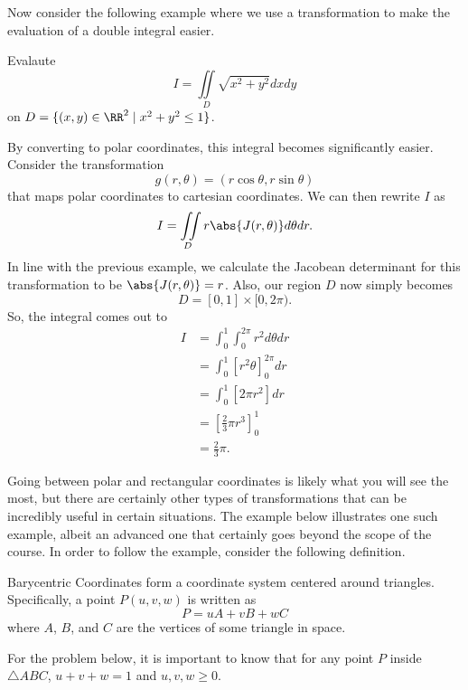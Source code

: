 Now consider the following example where we use a transformation to make the evaluation of a double integral easier.

\begin{example}
    Evalaute
    \[I = \iint\limits_{D}\sqrt{x^{2} + y^{2}}dxdy\]
    on $D = \{(x, y) \in \RR^{2} \mid x^{2} + y^{2} \leq 1\}$.

    \begin{soln}
        By converting to polar coordinates, this integral becomes significantly easier. Consider the transformation
        \[g(r, \theta) = (r\cos\theta, r\sin\theta)\]
        that maps polar coordinates to cartesian coordinates. We can then rewrite $I$ as
        \[I = \iint\limits_{D}r\abs{J(r, \theta)}d\theta dr.\]
        In line with the previous example, we calculate the Jacobean determinant for this transformation to be $\abs{J(r, \theta)} = r$. Also, our region $D$ now simply becomes
        \[D = [0, 1] \times [0, 2\pi).\]
        So, the integral comes out to
        \begin{align*}
            I &= \int_{0}^{1}\int_{0}^{2\pi}r^{2}d\theta dr \\
            &= \int_{0}^{1}\left[r^{2}\theta\right]_{0}^{2\pi}dr \\
            &= \int_{0}^{1}\left[2\pi r^{2}\right]dr \\
            &= \left[\frac{2}{3}\pi r^{3}\right]_{0}^{1} \\
            &= \frac{2}{3}\pi.
        \end{align*}
    \end{soln}
\end{example}

Going between polar and rectangular coordinates is likely what you will see the most, but there are certainly other types of transformations that can be incredibly useful in certain situations. The example below illustrates one such example, albeit an advanced one that certainly goes beyond the scope of the course. In order to follow the example, consider the following definition.

\begin{definition}
    Barycentric Coordinates form a coordinate system centered around triangles. Specifically, a point $P(u, v, w)$ is written as
    \[P = uA + vB + wC\]
    where $A$, $B$, and $C$ are the vertices of some triangle in space.
\end{definition}

For the problem below, it is important to know that for any point $P$ inside $\triangle ABC$, $u + v + w = 1$ and $u, v, w \geq 0$.

